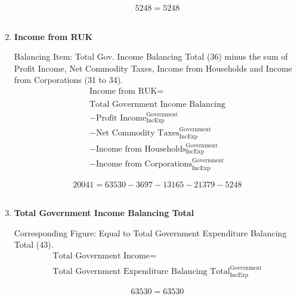 \begin{enumerate}
\begin{equation} \nonumber
5248 = 5248
\end{equation}\\


\item \textbf {Income from RUK}

Balancing Item: Total Gov. Income Balancing Total (36) minus the sum of Profit Income, Net Commodity Taxes, Income from Households and Income from Corporations (31 to 34).\\

\begin{equation}
\begin{split}
\text{Income from RUK} =  \\ \\
\text{Total Government Income Balancing}\\
-\text{Profit Income}^\text{Government}_\text{IncExp}\\
-\text{Net Commodity Taxes}^\text{Government}_\text{IncExp}\\
-\text{Income from Households}^\text{Government}_\text{IncExp}\\
-\text{Income from Corporations}^\text{Government}_\text{IncExp}
\end{split} \label{eq:2.5.39}
\end{equation}

\begin{equation} \nonumber
20041 = 63530-3697-13165-21379-5248
\end{equation}\\


\item \textbf {Total Government Income Balancing Total}

Corresponding Figure: Equal to Total Government Expenditure Balancing Total (43).\\

\begin{equation}
\begin{split}
\text{Total Government Income} =  \\ \\
\text{Total Government Expenditure Balancing Total}^\text{Government}_\text{IncExp}
\end{split} \label{eq:2.5.40}
\end{equation}

\begin{equation} \nonumber
63530 = 63530
\end{equation}\\




\end{enumerate}
